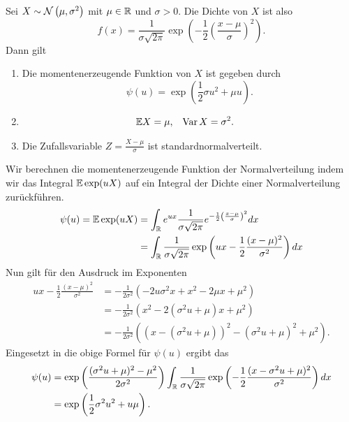 Sei $X \sim \mathcal N \left( \mu, \sigma^{2} \right)$ mit $\mu\in\mathbb{R}$ und $\sigma>0$. 
Die Dichte von $X$ ist also
\begin{equation*}
    f(x) = \frac{1}{\sigma \sqrt{2\pi}}
    \exp \left( -\frac{1}{2} \left( \frac{x-\mu}{\sigma} \right)^2\right).
\end{equation*}
Dann gilt
\begin{enumerate}
    \item Die momentenerzeugende Funktion von $X$ ist gegeben durch 
        \begin{equation*}
            \psi(u) = \exp \left( \frac{1}{2} \sigma u^2 + \mu u \right).
        \end{equation*}
    \item 
        \begin{align*}
            \mathbb{E} X &= \mu, & \operatorname{Var} X &= \sigma^2.
        \end{align*}
    \item Die Zufallsvariable $Z = \frac{X-\mu}{\sigma}$ ist standardnormalverteilt.
\end{enumerate}
\solution Wir berechnen die momentenerzeugende Funktion der
Normalverteilung indem wir das Integral $\mathbb{E} \exp (u X)$ auf ein Integral der
Dichte einer Normalverteilung zurückführen. 
\begin{align*}
    \psi(u) = \mathbb{E} \exp (u X)
    &= \int_{\mathbb{R}}^{} e^{ux } \frac{1}{\sigma \sqrt{2\pi}} 
    e^{ -\frac{1}{2}\left( \frac{x-\mu}{\sigma} \right)^2} dx \\
    &= \int_{\mathbb{R}}^{} \frac{1}{\sigma \sqrt{2\pi}} 
    \exp \left( ux - \frac{1}{2} \frac{(x-\mu)^2}{\sigma^2} \right) dx
\end{align*}
Nun gilt für den Ausdruck im Exponenten
\begin{align*}
    ux - \frac{1}{2} \frac{(x-\mu)^2}{\sigma^2} &= 
    -\frac{1}{2\sigma^2} \left( -2 u\sigma^2 x + x^2 - 2\mu x + \mu^2 \right) \\
    &= -\frac{1}{2\sigma^2} \left( x^2 - 2( \sigma^2 u +\mu  )x + \mu^2  \right)  \\
    &= -\frac{1}{2\sigma^2} \left( \left( x - (\sigma^2 u + \mu) \right)^2 
    - (\sigma^2 u + \mu)^2 + \mu^2  \right).
\end{align*}
Eingesetzt in die obige Formel für $\psi(u)$ ergibt das 
\begin{align*}
    \psi(u) &=  \exp \left( \frac{ (\sigma^2 u + \mu)^2 - \mu^2 }{2 \sigma^2} \right)
    \int_{\mathbb{R}}^{} \frac{1}{\sigma \sqrt{2\pi}} 
    \exp \left( - \frac{1}{2} \frac{(x- \sigma^2 u + \mu)^2}{\sigma^2} \right) dx \\
    &= \exp \left( \frac{1}{2} \sigma^2 u^2 + u \mu \right).
\end{align*}
